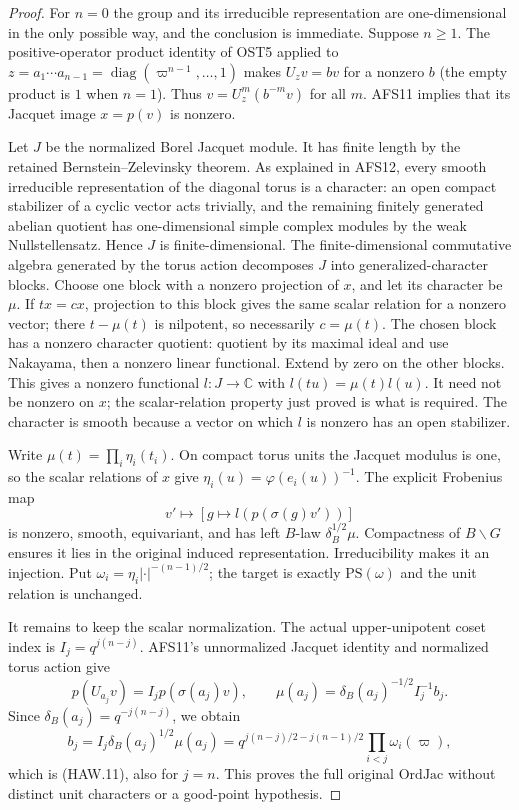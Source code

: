 \begin{proof}
For $n=0$ the group and its irreducible representation are
one-dimensional in the only possible way, and the conclusion
is immediate.  Suppose $n\ge1$.  The positive-operator
product identity of OST5 applied to
$z=a_1\cdots a_{n-1}=\operatorname{diag}
(\varpi^{n-1},\ldots,1)$ makes $U_zv=bv$ for a nonzero
$b$ (the empty product is $1$ when $n=1$).  Thus
$v=U_z^m(b^{-m}v)$ for all $m$.  AFS11 implies that its
Jacquet image $x=p(v)$ is nonzero.

Let $J$ be the normalized Borel Jacquet module.  It has finite
length by the retained Bernstein--Zelevinsky theorem.  As
explained in AFS12, every smooth irreducible representation
of the diagonal torus is a character: an open compact
stabilizer of a cyclic vector acts trivially, and the
remaining finitely generated abelian quotient has
one-dimensional simple complex modules by the weak
Nullstellensatz.  Hence $J$ is finite-dimensional.
The finite-dimensional commutative algebra generated by the
torus action decomposes $J$ into generalized-character blocks.
Choose one block with a nonzero projection of $x$, and let
its character be $\mu$.  If $t x=cx$, projection to this
block gives the same scalar relation for a nonzero vector;
there $t-\mu(t)$ is nilpotent, so necessarily $c=\mu(t)$.
The chosen block has a nonzero character quotient: quotient
by its maximal ideal and use Nakayama, then a nonzero linear
functional.  Extend by zero on the other blocks.  This gives
a nonzero functional $l:J\to\mathbb C$ with
$l(tu)=\mu(t)l(u)$.  It need not be nonzero on $x$; the
scalar-relation property just proved is what is required.
The character is smooth because a vector on which $l$ is
nonzero has an open stabilizer.

Write $\mu(t)=\prod_i\eta_i(t_i)$.  On compact torus units
the Jacquet modulus is one, so the scalar relations of $x$
give $\eta_i(u)=\varphi(e_i(u))^{-1}$.  The explicit
Frobenius map
\[
        v'\longmapsto [g\longmapsto l(p(\sigma(g)v'))]
 \tag{HAW.12}
\]
is nonzero, smooth, equivariant, and has left $B$-law
$\delta_B^{1/2}\mu$.  Compactness of $B\backslash G$
ensures it lies in the original induced representation.
Irreducibility makes it an injection.  Put
$\omega_i=\eta_i|\cdot|^{-(n-1)/2}$; the target is exactly
$\mathrm{PS}(\omega)$ and the unit relation is unchanged.

It remains to keep the scalar normalization.  The actual
upper-unipotent coset index is $I_j=q^{j(n-j)}$.  AFS11's
unnormalized Jacquet identity and normalized torus action give
\[
 p(U_{a_j}v)=I_jp(\sigma(a_j)v),\qquad
 \mu(a_j)=\delta_B(a_j)^{-1/2}I_j^{-1}b_j.
\]
Since $\delta_B(a_j)=q^{-j(n-j)}$, we obtain
\[
 b_j=I_j\delta_B(a_j)^{1/2}\mu(a_j)
     =q^{j(n-j)/2-j(n-1)/2}\prod_{i<j}\omega_i(\varpi),
\]
which is (HAW.11), also for $j=n$.  This proves the full
original $\mathrm{OrdJac}$ without distinct unit characters
or a good-point hypothesis.
\end{proof}

